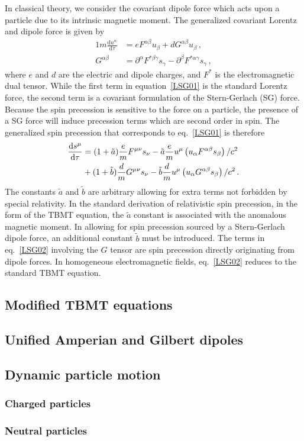In classical theory, we consider the covariant dipole force which acts upon a particle due to its intrinsic magnetic moment. The generalized covariant Lorentz and dipole force is given by
\begin{alignat}{1}
  \label{LSG01} m\frac{\mathrm{d}u^{\alpha}}{\mathrm{d}\tau}&=eF^{\alpha\beta}u_{\beta}+dG^{\alpha\beta}u_{\beta}\,,\\
  \label{LSG02} G^{\alpha\beta}&=\partial^{\alpha}F^{*\beta\gamma}s_{\gamma}-\partial^{\beta}F^{*\alpha\gamma}s_{\gamma}\,,
\end{alignat}
where $e$ and $d$ are the electric and dipole charges, and $F^{*}$ is the electromagnetic dual tensor. While the first term in equation~\eqref{LSG01} is the standard Lorentz force, the second term is a covariant formulation of the Stern-Gerlach (SG) force. Because the spin precession is sensitive to the force on a particle, the presence of a SG force will induce precession terms which are second order in spin. The generalized spin precession that corresponds to eq.~\eqref{LSG01} is therefore
\begin{alignat}{1}
  \notag\frac{\mathrm{d}s^{\mu}}{\mathrm{d}\tau}&=(1+\tilde{a})\frac{e}{m}F^{\mu\nu}s_{\nu}-\tilde{a}\frac{e}{m}u^{\mu}\left(u_{\alpha}F^{\alpha\beta}s_{\beta}\right)/c^{2}\\
  \label{LSG03}&+(1+\tilde{b})\frac{d}{m}G^{\mu\nu}s_{\nu}-\tilde{b}\frac{d}{m}u^{\mu}\left(u_{\alpha}G^{\alpha\beta}s_{\beta}\right)/c^{2}\,.
\end{alignat}
The constants $\tilde{a}$ and $\tilde{b}$ are arbitrary allowing for extra terms not forbidden by special relativity. In the standard derivation of relativistic spin precession, in the form of the TBMT equation, the $\tilde{a}$ constant is associated with the anomalous magnetic moment. In allowing for spin precession sourced by a Stern-Gerlach dipole force, an additional constant $\tilde{b}$ must be introduced. The terms in eq.~\eqref{LSG02} involving the $G$ tensor are spin precession directly originating from dipole forces. In homogeneous electromagnetic fields, eq.~\eqref{LSG02} reduces to the standard TBMT equation.

        \subsection{Modified TBMT equations}
        \subsection{Unified Amperian and Gilbert dipoles}
        \subsection{Dynamic particle motion}
            \subsubsection{Charged particles}
            \subsubsection{Neutral particles}